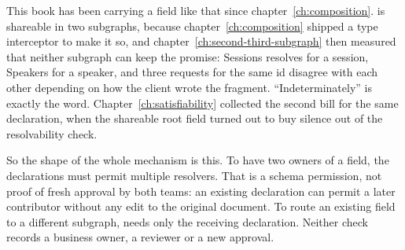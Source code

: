 %
This book has been carrying a field like that since
chapter~\ref{ch:composition}.  is shareable in two subgraphs,
because chapter~\ref{ch:composition} shipped a type interceptor to make it so,
and
chapter~\ref{ch:second-third-subgraph} then measured that neither subgraph can
keep the promise: Sessions resolves  for a session, Speakers
for a speaker, and three requests for the same id disagree with each other
depending on how the client wrote the fragment. \enquote{Indeterminately} is
exactly the word. Chapter~\ref{ch:satisfiability} collected the second bill
for the same declaration, when the shareable root field turned out to buy
silence out of the resolvability check.

%
So the shape of the whole mechanism is this. To have two owners of a field,
the declarations must permit multiple resolvers. That is a schema permission,
not proof of fresh approval by both teams: an existing 
declaration can permit a later contributor without any edit to the original
document. To route an existing field to a different subgraph,
 needs only the receiving declaration. Neither check records
a business owner, a reviewer or a new approval.
%
